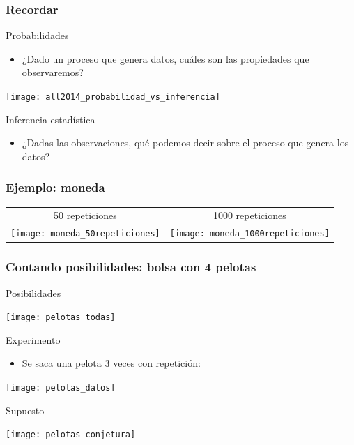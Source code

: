 \documentclass[table]{beamer}
\begin{document}
\begin{frame}
    \frametitle{Recordar}
    \begin{block}{Probabilidades}
        \begin{itemize}
            \item ¿Dado un proceso que genera datos, cuáles son las propiedades que observaremos?
        \end{itemize}
    \end{block}
    \begin{center}
        \texttt{[image: all2014\_probabilidad\_vs\_inferencia]}
    \end{center}
    \begin{block}{Inferencia estadística}
        \begin{itemize}
            \item ¿Dadas las observaciones, qué podemos decir sobre el proceso que genera los datos?
        \end{itemize}
    \end{block}
\end{frame}

\begin{frame}
    \frametitle{Ejemplo: moneda}
    \begin{tabular}{cc}
        50 repeticiones & 1000 repeticiones \\
        \texttt{[image: moneda\_50repeticiones]} &
        \texttt{[image: moneda\_1000repeticiones]}
    \end{tabular}
\end{frame}

\iffalse
\begin{frame}
    \frametitle{Contando posibilidades: bolsa con 4 pelotas}
    \begin{block}{Posibilidades}
        \begin{center}
            \texttt{[image: pelotas\_todas]}
        \end{center}
    \end{block}
    \begin{block}{Experimento}
        \begin{itemize}
            \item Se saca una pelota 3 veces con repetición:
        \end{itemize}
        \begin{center}
            \texttt{[image: pelotas\_datos]}
        \end{center}
    \end{block}
    \begin{block}{Supuesto}
        \begin{center}
            \texttt{[image: pelotas\_conjetura]}
        \end{center}
    \end{block}
\end{frame}
\end{document}
